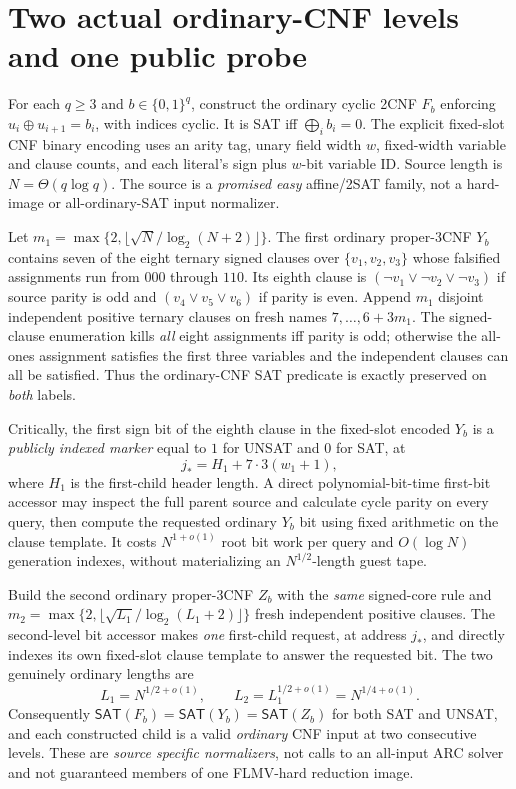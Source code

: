 \documentclass[11pt]{article}
\newcommand{\SAT}{\mathsf{SAT}}
\begin{document}
\section{Two actual ordinary-CNF levels and one public probe}
For each \(q\ge3\) and \(b\in\{0,1\}^{q}\), construct
the ordinary cyclic 2CNF \(F_b\) enforcing
\(u_i\oplus u_{i+1}=b_i\), with indices cyclic.
It is SAT iff \(\bigoplus_i b_i=0\).
The explicit fixed-slot CNF binary encoding uses an arity
tag, unary field width \(w\), fixed-width variable and
clause counts, and each literal's sign plus \(w\)-bit
variable ID. Source length is \(N=\Theta(q\log q)\).
The source is a \emph{promised easy} affine/2SAT
family, not a hard-image or all-ordinary-SAT input
normalizer.

Let \(m_1=\max\{2,\lfloor\sqrt N/
\log_2(N+2)\rfloor\}\).
The first ordinary proper-3CNF \(Y_b\) contains
seven of the eight ternary signed clauses over
\(\{v_1,v_2,v_3\}\) whose falsified assignments run
from \(000\) through \(110\). Its eighth clause
is \((\neg v_1\vee\neg v_2\vee\neg v_3)\)
if source parity is odd and
\((v_4\vee v_5\vee v_6)\) if parity is even.
Append \(m_1\) disjoint independent positive ternary
clauses on fresh names \(7,\ldots,6+3m_1\).
The signed-clause enumeration kills \emph{all}
eight assignments iff parity is odd; otherwise
the all-ones assignment satisfies the first
three variables and the independent clauses can
all be satisfied. Thus the ordinary-CNF SAT
predicate is exactly preserved on \emph{both} labels.

Critically, the first sign bit of the eighth clause
in the fixed-slot encoded \(Y_b\) is a \emph{publicly
indexed marker} equal to \(1\) for UNSAT and \(0\)
for SAT, at
\[
 j_*=H_1+7\cdot3(w_1+1),\tag{2}
\]
where \(H_1\) is the first-child header length.
A direct polynomial-bit-time first-bit accessor
may inspect the full parent source and calculate
cycle parity on every query, then compute
the requested ordinary \(Y_b\) bit using fixed
arithmetic on the clause template.
It costs \(N^{1+o(1)}\) root bit work per query
and \(O(\log N)\) generation indexes, without
materializing an \(N^{1/2}\)-length guest tape.

Build the second ordinary proper-3CNF \(Z_b\)
with the \emph{same} signed-core rule and
\(m_2=\max\{2,\lfloor\sqrt{L_1}/
\log_2(L_1+2)\rfloor\}\) fresh independent
positive clauses. The second-level bit accessor
makes \emph{one} first-child request, at address
\(j_*\), and directly indexes its own fixed-slot
clause template to answer the requested bit.
The two genuinely ordinary lengths are
\[
 L_1=N^{1/2+o(1)},\qquad
 L_2=L_1^{1/2+o(1)}=N^{1/4+o(1)}.\tag{3}
\]
Consequently \(\SAT(F_b)=\SAT(Y_b)=\SAT(Z_b)\)
for both SAT and UNSAT, and each constructed
child is a valid \emph{ordinary} CNF input at
two consecutive levels. These are \emph{source
specific normalizers}, not calls to an all-input
ARC solver and not guaranteed members of one
FLMV-hard reduction image.
\end{document}
